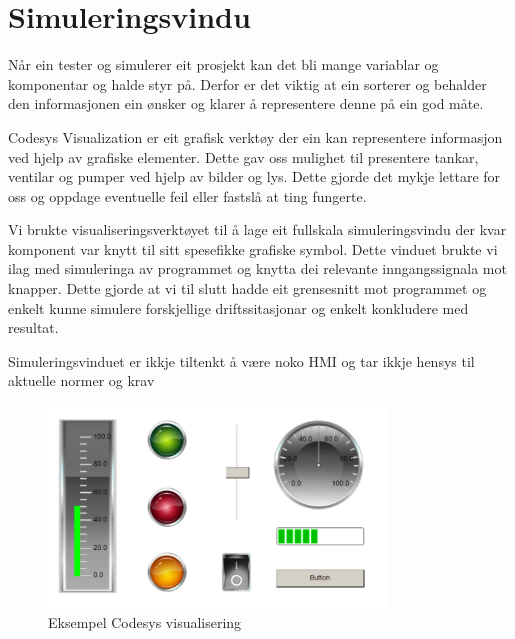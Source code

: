 \section{Simuleringsvindu}
\thispagestyle{fancy}

Når ein tester og simulerer eit prosjekt kan det bli mange variablar og komponentar
og halde styr på. Derfor er det viktig at ein sorterer og behalder den informasjonen ein
ønsker og klarer å representere denne på ein god måte.

Codesys Visualization er eit grafisk verktøy der ein kan representere informasjon
ved hjelp av grafiske elementer. Dette gav oss mulighet til presentere tankar, ventilar og pumper
ved hjelp av bilder og lys. 
Dette gjorde det mykje lettare for oss og oppdage eventuelle feil eller fastslå at ting fungerte.

Vi brukte visualiseringsverktøyet til å lage eit fullskala simuleringsvindu der kvar komponent
var knytt til sitt spesefikke grafiske symbol. Dette vinduet brukte vi ilag med simuleringa
av programmet og knytta dei relevante inngangssignala mot knapper. 
Dette gjorde at vi til slutt hadde eit grensesnitt mot programmet og enkelt kunne simulere
forskjellige driftssitasjonar og enkelt konkludere med resultat.

Simuleringsvinduet er ikkje tiltenkt å være noko 
\gls{HMI} og tar ikkje hensys til aktuelle normer og krav

\begin{figure}[htbp]
    \centering
    \includegraphics[width=0.8\textwidth]{Bilder/Codesys symbol.png}
    \caption{Eksempel Codesys visualisering}\label{fig:CodesysVisualisering}
\end{figure}

\newpage
